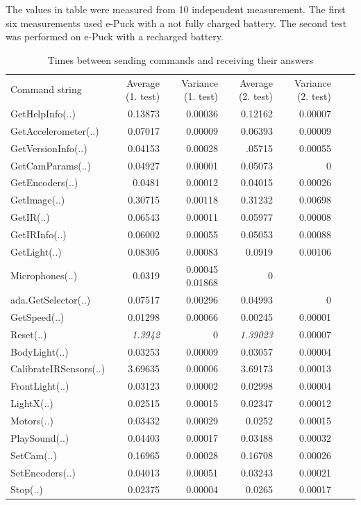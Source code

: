 \documentclass[12pt,notitlepage]{report}
\begin{document}
	The values in table were measured from 10 independent measurement. 
	The first six measurements used e-Puck with a not fully charged battery.
	The second test was performed on e-Puck with a recharged battery.


\begin{table}[!hbp]
\begin{tabular}{lrrrrrr}
Command string & {\small Average (1. test)}  & {\small Variance (1. test)}& {\small Average (2. test)} & {\small Variance (2. test)}\\
GetHelpInfo(..)& 0.13873 & 0.00036& 0.12162&0.00007\\
GetAccelerometer(..)&0.07017&0.00009&  0.06393&0.00009\\ 
GetVersionInfo(..)&0.04153&0.00028&.05715&0.00055\\ 
GetCamParams(..)&0.04927&0.00001&  0.05073&0\\ 
GetEncoders(..)&0.0481&0.00012&  0.04015&0.00026\\ 
GetImage(..)&0.30715 &0.00118& 0.31232&0.00698\\ 
GetIR(..)&0.06543 &0.00011&0.05977&0.00008\\ 
GetIRInfo(..)&0.06002 &0.00055& 0.05053&0.00088\\
GetLight(..)&0.08305 &0.00083&0.0919&0.00106\\
Microphones(..)& 0.0319&0.00045 0.01868&0\\
ada.GetSelector(..)& 0.07517&0.00296& 0.04993& 0\\
GetSpeed(..)& 0.01298&0.00066&   0.00245&0.00001\\
Reset(..) &{\it 1.3942} & 0 &{\it 1.39023} &0.00007 \\
BodyLight(..)& 0.03253&0.00009&   0.03057&0.00004\\
CalibrateIRSensors(..)&3.69635&0.00006&3.69173&0.00013\\
FrontLight(..)&0.03123&0.00002 & 0.02998&0.00004\\
LightX(..)& 0.02515&0.00015&  0.02347&0.00012\\
Motors(..)&0.03432&0.00029&  0.0252&0.00015\\
PlaySound(..)& 0.04403& 0.00017&  0.03488&0.00032\\
SetCam(..)& 0.16965& 0.00028& 0.16708&0.00026\\
SetEncoders(..)& 0.04013&0.00051& 0.03243&0.00021\\
Stop(..)&0.02375&0.00004&  0.0265&0.00017\\
\end{tabular}
\caption{Times between sending commands and receiving their answers}
\label{times1}
\end{table}
\end{document}
